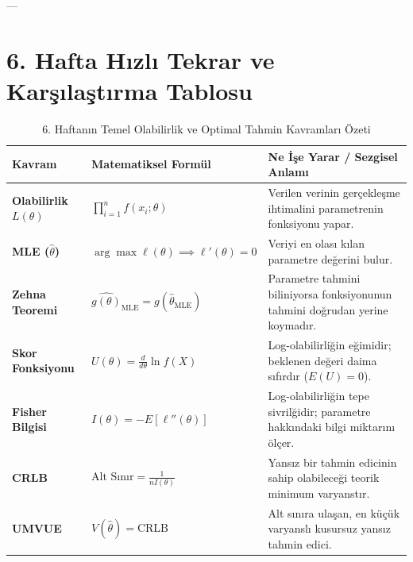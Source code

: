 \documentclass[12pt,a4paper]{article}
\begin{document}
---

\section{6. Hafta Hızlı Tekrar ve Karşılaştırma Tablosu}

\begin{table}[ht]
\centering
\small
\renewcommand{\arraystretch}{1.35}
\begin{tabularx}{\textwidth}{@{}l l X@{}}
\toprule
\textbf{Kavram} & \textbf{Matematiksel Formül} & \textbf{Ne İşe Yarar / Sezgisel Anlamı} \\ \midrule
\textbf{Olabilirlik $L(\theta)$} & $\prod_{i=1}^n f(x_i; \theta)$ & Verilen verinin gerçekleşme ihtimalini parametrenin fonksiyonu yapar. \\
\textbf{MLE ($\hat{\theta}$)} & $\arg\max \ell(\theta) \implies \ell'(\theta) = 0$ & Veriyi en olası kılan parametre değerini bulur. \\
\textbf{Zehna Teoremi} & $\widehat{g(\theta)}_{\text{MLE}} = g(\hat{\theta}_{\text{MLE}})$ & Parametre tahmini biliniyorsa fonksiyonunun tahmini doğrudan yerine koymadır. \\
\textbf{Skor Fonksiyonu} & $U(\theta) = \frac{d}{d\theta}\ln f(X)$ & Log-olabilirliğin eğimidir; beklenen değeri daima sıfırdır ($E(U)=0$). \\
\textbf{Fisher Bilgisi} & $I(\theta) = -E[\ell''(\theta)]$ & Log-olabilirliğin tepe sivrilğidir; parametre hakkındaki bilgi miktarını ölçer. \\
\textbf{CRLB} & $\text{Alt Sınır} = \frac{1}{n I(\theta)}$ & Yansız bir tahmin edicinin sahip olabileceği teorik minimum varyanstır. \\
\textbf{UMVUE} & $V(\hat{\theta}) = \text{CRLB}$ & Alt sınıra ulaşan, en küçük varyanslı kusursuz yansız tahmin edici. \\ \bottomrule
\end{tabularx}
\caption{6. Haftanın Temel Olabilirlik ve Optimal Tahmin Kavramları Özeti}
\end{table}
\end{document}
